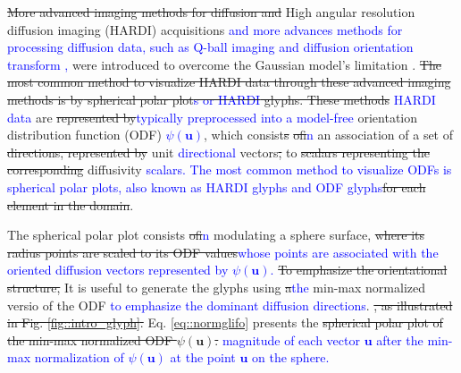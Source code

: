 \documentclass[twoside,twocolumn,10pt]{article}
\begin{document}
\sout{More advanced imaging methods for diffusion and} High angular resolution diffusion imaging (HARDI) acquisitions \textcolor{blue}{and more advances methods for processing diffusion data, such as Q-ball imaging \cite{???} and diffusion orientation transform \cite{???},} were introduced to overcome the Gaussian model's limitation \cite{descoteaux2015}. %
\sout{The most common method to visualize HARDI data through the\sout{se} advanced imaging methods is \sout{by} spherical polar plot\textcolor{blue}{s or HARDI} glyphs. These methods} \textcolor{blue}{HARDI data} are \sout{represented by}\textcolor{blue}{typically preprocessed into a model-free} orientation distribution function (ODF) \textcolor{blue}{$\psi(\bm{u})$}, which consist\sout{s} \sout{of}\textcolor{blue}{in} an association of a set of \sout{directions, represented by} unit \textcolor{blue}{directional} vectors\sout{,} to \sout{scalars representing the corresponding} diffusivity \textcolor{blue}{scalars. The most common method to visualize ODFs is spherical polar plots, also known as HARDI glyphs and ODF glyphs}\sout{for each element in the domain}. 

The spherical polar plot consists \sout{of}\textcolor{blue}{in} modulating a sphere surface, \sout{where its radius points are scaled to its ODF values}\textcolor{blue}{whose points are  associated with the oriented diffusion vectors represented by  $\psi(\bm{u})$.} \sout{To emphasize the orientational structure,} It is useful to generate the glyphs using \sout{a}\textcolor{blue}{the} min-max normalized versio of the ODF \cite{TuchQBall2004} \textcolor{blue}{to emphasize the dominant diffusion directions}. \sout{, as illustrated in Fig. \ref{fig::intro_glyph}.} Eq. \ref{eq::normglifo} presents the \sout{spherical polar plot of the min-max normalized ODF $\psi(\bm{u})$.} \textcolor{blue}{magnitude of each vector $\bm{u}$ after the min-max normalization of $\psi(\bm{u})$ at the point $\bm{u}$ on the sphere.} 
\end{document}
